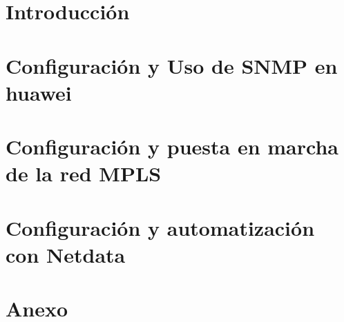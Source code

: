 \documentclass[a4paper, 11pt]{report} %
\begin{document}
 




\tableofcontents%
\newpage
\chapter{Introducción}


\chapter{Configuración y Uso de SNMP en huawei}


\chapter{Configuración y puesta en marcha de la red MPLS}


\chapter{Configuración y automatización con Netdata}


\chapter{Anexo}


\newpage
\printbibliography
\end{document}
